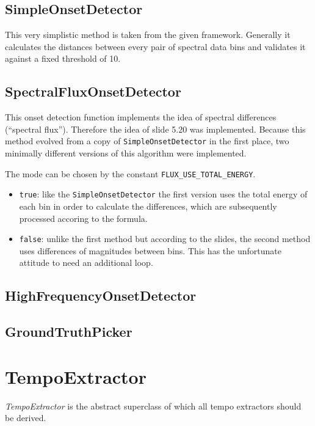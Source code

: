 \subsection{\ttfamily SimpleOnsetDetector} \label{ssec:onsetsimple}
This very simplistic method is taken from the given framework. Generally it
calculates the distances between every pair of spectral data bins and validates
it against a fixed threshold of 10.

\subsection{\ttfamily SpectralFluxOnsetDetector} \label{ssec:onsetflux}
This onset detection function implements the idea of spectral differences
(``spectral flux''). Therefore the idea of slide 5.20 was implemented. Because
this method evolved from a copy of \texttt{SimpleOnsetDetector} in the first
place, two minimally different versions of this algorithm were implemented.

The mode can be chosen by the constant \texttt{FLUX\_USE\_TOTAL\_ENERGY}.

\begin{itemize}
  \item \texttt{true}: like the \texttt{SimpleOnsetDetector} the first version
  uses the total energy of each bin in order to calculate the differences, which
  are subsequently processed accoring to the formula.
  \item \texttt{false}: unlike the first method but according to the slides, the
  second method uses differences of magnitudes between bins. This has the
  unfortunate attitude to need an additional loop.
\end{itemize}

\subsection{\ttfamily HighFrequencyOnsetDetector} \label{ssec:onsethighfreq}

\subsection{\ttfamily GroundTruthPicker} \label{ssec:onsetgroundtruth}

\section{\ttfamily TempoExtractor} \label{sec:tempo}
\emph{TempoExtractor} is the abstract superclass of which all tempo extractors
should be derived.

